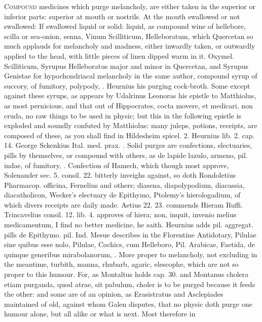 {\lettrine{C}{ompound} medicines which purge melancholy, are either taken in the
superior or inferior parts: superior at mouth or nostrils. At the mouth
swallowed or not swallowed: If swallowed liquid or solid: liquid, as
compound wine of hellebore, scilla or sea-onion, senna, Vinum
Scilliticum, Helleboratum, which Quercetan so much applauds for
melancholy and madness, either inwardly taken, or outwardly applied to
the head, with little pieces of linen dipped warm in it. Oxymel.
Scilliticum, Syrupus Helleboratus major and minor in Quercetan, and
Syrupus Genistae for hypochondriacal melancholy in the same author,
compound syrup of succory, of fumitory, polypody, \etc{}. Heurnius his
purging cock-broth. Some except against these syrups, as appears by
Udalrinus Leonoras his epistle to Matthiolus, as most pernicious,
and that out of Hippocrates, cocta movere, et medicari, non cruda, no
raw things to be used in physic; but this in the following epistle is
exploded and soundly confuted by Matthiolus: many juleps, potions,
receipts, are composed of these, as you shall find in Hildesheim
spicel. 2. Heurnius lib. 2. cap. 14. George Sckenkius Ital. med. prax.
\etc{}.
Solid purges are confections, electuaries, pills by themselves, or
compound with others, as de lapide lazulo, armeno, pil. indae, of
fumitory, \etc{}. Confection of Hamech, which though most approve,
Solenander sec. 5. consil. 22. bitterly inveighs against, so doth
Rondoletius Pharmacop. officina, Fernelius and others; diasena,
diapolypodium, diacassia, diacatholicon, Wecker's electuary de
Epithymo, Ptolemy's hierologadium, of which divers receipts are daily
made.
Aetius 22. 23. commends Hieram Ruffi. Trincavelius consil. 12. lib. 4.
approves of hiera; non, inquit, invenio melius medicamentum, I find no
better medicine, he saith. Heurnius adds pil. aggregat. pills de
Epithymo. pil. Ind. Mesue describes in the Florentine Antidotary,
Pilulae sine quibus esse nolo, Pilulae, Cochics, cum Helleboro, Pil.
Arabicae, Faetida, de quinque generibus mirabolanorum, \etc{}. More proper
to melancholy, not excluding in the meantime, turbith, manna, rhubarb,
agaric, elescophe, \etc{} which are not so proper to this humour. For, as
Montaltus holds cap. 30. and Montanus cholera etiam purganda, quod
atrae, sit pabulum, choler is to be purged because it feeds the other:
and some are of an opinion, as Erasistratus and Asclepiades maintained
of old, against whom Galen disputes, that no physic doth purge
one humour alone, but all alike or what is next. Most therefore in
}
